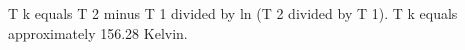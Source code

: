 T k equals T 2 minus T 1 divided by ln (T 2 divided by T 1).  
T k equals approximately 156.28 Kelvin.